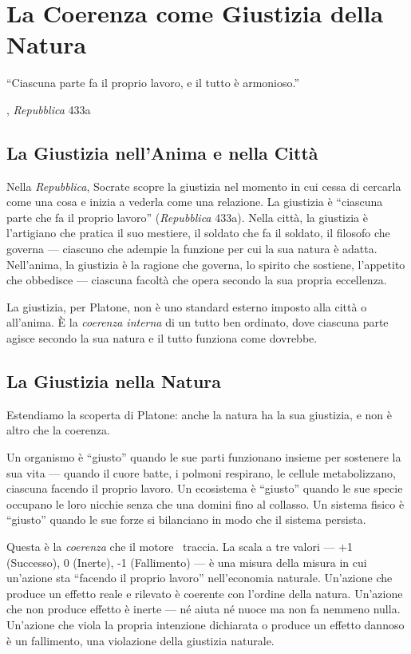 \chapter{La Coerenza come Giustizia della Natura}

\epigraph{``Ciascuna parte fa il proprio lavoro, e il tutto \`e armonioso.''}
{\textcite{plato1997complete}, \emph{Repubblica} 433a}

\section{La Giustizia nell'Anima e nella Citt\`a}

Nella \emph{Repubblica}, Socrate scopre la giustizia nel momento in cui
cessa di cercarla come una cosa e inizia a vederla come una relazione. La
giustizia \`e ``ciascuna parte che fa il proprio lavoro'' (\emph{Repubblica}
433a). Nella citt\`a, la giustizia \`e l'artigiano che pratica il suo
mestiere, il soldato che fa il soldato, il filosofo che governa ---
ciascuno che adempie la funzione per cui la sua natura \`e adatta.
Nell'anima, la giustizia \`e la ragione che governa, lo spirito che
sostiene, l'appetito che obbedisce --- ciascuna facolt\`a che opera
secondo la sua propria eccellenza.

La giustizia, per Platone, non \`e uno standard esterno imposto alla
citt\`a o all'anima. \`E la \emph{coerenza interna} di un tutto
ben ordinato, dove ciascuna parte agisce secondo la sua natura e il
tutto funziona come dovrebbe.

\section{La Giustizia nella Natura}

Estendiamo la scoperta di Platone: anche la natura ha la sua giustizia,
e non \`e altro che la coerenza.

Un organismo \`e ``giusto'' quando le sue parti funzionano insieme per
sostenere la sua vita --- quando il cuore batte, i polmoni respirano, le
cellule metabolizzano, ciascuna facendo il proprio lavoro. Un ecosistema
\`e ``giusto'' quando le sue specie occupano le loro nicchie senza che
una domini fino al collasso. Un sistema fisico \`e ``giusto'' quando le
sue forze si bilanciano in modo che il sistema persista.

Questa \`e la \emph{coerenza} che il motore \physis\ traccia. La scala
a tre valori --- +1 (Successo), 0 (Inerte), -1 (Fallimento) --- \`e una
misura della misura in cui un'azione sta ``facendo il proprio lavoro''
nell'economia naturale. Un'azione che produce un effetto reale e rilevato
\`e coerente con l'ordine della natura. Un'azione che non produce effetto
\`e inerte --- n\'e aiuta n\'e nuoce ma non fa nemmeno nulla. Un'azione
che viola la propria intenzione dichiarata o produce un effetto dannoso
\`e un fallimento, una violazione della giustizia naturale.

